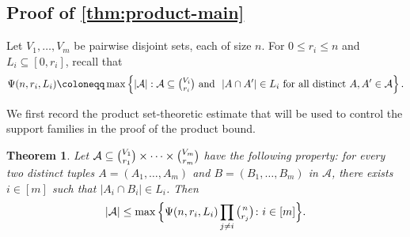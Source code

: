 \documentclass[10pt,a4paper]{article}
\theoremstyle{plain}
\newtheorem{theorem}{Theorem}[section]
\theoremstyle{definition}
\theoremstyle{plain}
\newcommand{\calA}{\mathcal A}
\begin{document}
\subsection{Proof of \texorpdfstring{\cref{thm:product-main}}{Theorem 1.4}}

Let $V_1,\ldots,V_m$ be pairwise disjoint sets, each of size $n$.  For $0\le r_i\le n$ and $L_i\subseteq[0,r_i]$, recall that 
\[
        \Psi(n,r_i,L_i)\coloneqq\max\left\{|\calA|:\calA\subseteq\tbinom{V_i}{r_i}\text{ and }
        \ |A\cap A'|\in L_i\text{ for all distinct }A,A'\in\calA\right\}.
\]

We first record the product set-theoretic estimate that will be used to control the support families in the proof of the product bound.

\begin{theorem}\label{thm:product-intersection}
Let $\calA\subseteq\tbinom{V_1}{r_1}\times\cdots\times\tbinom{V_m}{r_m}$ have the following property: for every two distinct tuples $A=(A_1,\ldots,A_m)$ and $B=(B_1,\ldots,B_m)$ in $\calA$, there exists $i\in[m]$ such that $|A_i\cap B_i|\in L_i$.  Then
\[
        |\calA|\le
        \max\Big\{\Psi(n,r_i,L_i)\prod_{j\ne i}\tbinom{n}{r_j} \colon i \in [m]\Big\}.
\]
\end{theorem}
\end{document}
